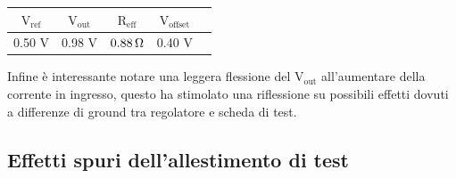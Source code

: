 \begin{center}
\begin{tabular}{ccccc}
\hline
$\mathrm{V_{ref}}$ & $\mathrm{V_{out}}$ & $\mathrm{R_{eff}}$ & $\mathrm{V_{offset}}$ \\
\hline
0.50 V & 0.98 V & $0.88{\rm \, \Omega}$ & 0.40 V\\
\hline
\end{tabular}
\end{center}
\FloatBarrier
Infine è interessante notare una leggera flessione del $\mathrm{V_{out}}$ all'aumentare  della corrente in ingresso, questo ha stimolato una riflessione su possibili effetti dovuti a differenze di ground tra regolatore e scheda di test.

\subsection{Effetti spuri dell'allestimento di test}
\label{EffettiSpuri}

